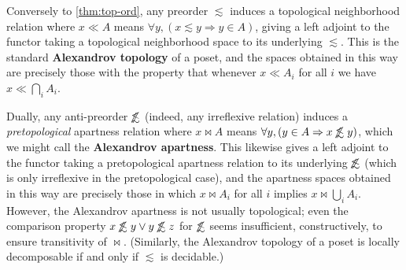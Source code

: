 \documentclass{article}
\def\oapt{\mathrel{\!\not\,\not\lesssim}}
\def\leapx{\lesssim}
\let\implies\Rightarrow
\def\inv{^{-1}}
\begin{document}
\begin{rmk}
  Conversely to \cref{thm:top-ord}, any preorder $\leapx$ induces a topological neighborhood relation where $x\ll A$ means $\forall y, (x\leapx y \implies y\in A)$, giving a left adjoint to the functor taking a topological neighborhood space to its underlying $\leapx$.
  This is the standard \textbf{Alexandrov topology} of a poset, and the spaces obtained in this way are precisely those with the property that whenever $x\ll A_i$ for all $i$ we have $x\ll \bigcap_i A_i$.
  


  Dually, any anti-preorder $\oapt$ (indeed, any irreflexive relation) induces a \emph{pretopological} apartness relation where $x\bowtie A$ means $\forall y, (y\in A \implies x\oapt y)$, which we might call the \textbf{Alexandrov apartness}.
  This likewise gives a left adjoint to the functor taking a pretopological apartness relation to its underlying $\oapt$ (which is only irreflexive in the pretopological case), and the apartness spaces obtained in this way are precisely those in which $x\bowtie A_i$ for all $i$ implies $x\bowtie \bigcup_i A_i$.
  However, the Alexandrov apartness is not usually topological; even the comparison property $x\oapt y \lor y\oapt z$ for $\oapt$ seems insufficient, constructively, to ensure transitivity of $\bowtie$.
  (Similarly, the Alexandrov topology of a poset is locally decomposable if and only if $\leapx$ is decidable.)
\end{rmk}
\end{document}
